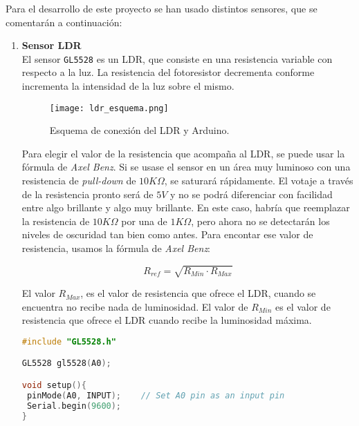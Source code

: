 Para el desarrollo de este proyecto se han usado distintos sensores, que se comentarán a continuación:

\begin{enumerate}
\item \textbf{Sensor \acf{LDR}} \\
El sensor \texttt{GL5528} es un \ac{LDR}, que consiste en una resistencia variable con respecto a la luz. La resistencia del fotoresistor decrementa conforme incrementa la intensidad de la luz sobre el mismo. 

\begin{figure}[!h]
\begin{center}
\texttt{[image: ldr\_esquema.png]}
\caption{Esquema de conexión del \ac{LDR} y Arduino.}
\label{fig:gl5528}
\end{center}
\end{figure}

Para elegir el valor de la resistencia que acompaña al \ac{LDR}, se puede usar la fórmula de \textit{Axel Benz}. Si se usase el sensor en un área muy luminoso con una resistencia de \textit{pull-down} de $10K\Omega$, se saturará rápidamente. El votaje a través de la resistencia pronto será de $5V$ y no se podrá diferenciar con facilidad entre algo brillante y algo muy brillante. En este caso, habría que reemplazar la resistencia de $10K\Omega$ por una de $1K\Omega$, pero ahora no se detectarán los niveles de oscuridad tan bien como antes. Para encontar ese valor de resistencia, usamos la fórmula de \textit{Axel Benz}:

\begin{center}
\begin{equation}
R_{ref} = \sqrt{R_{Min} \cdot R_{Max}}
\end{equation}
\label{eq:referenceResistance}
\end{center}

El valor $R_{Max}$, es el valor de resistencia que ofrece el \ac{LDR}, cuando se encuentra no recibe nada de luminosidad. El valor de $R_{Min}$ es el valor de resistencia que ofrece el \ac{LDR} cuando recibe la luminosidad máxima.

\begin{lstlisting}[language=c++,captionpos=t,caption={\textbf{Utilización básica del sensor GL5528.}},label={lst:basicgl5528}]
#include "GL5528.h"

GL5528 gl5528(A0);

void setup(){
 pinMode(A0, INPUT);    // Set A0 pin as an input pin
 Serial.begin(9600);
}


\end{lstlisting}
\end{enumerate}
